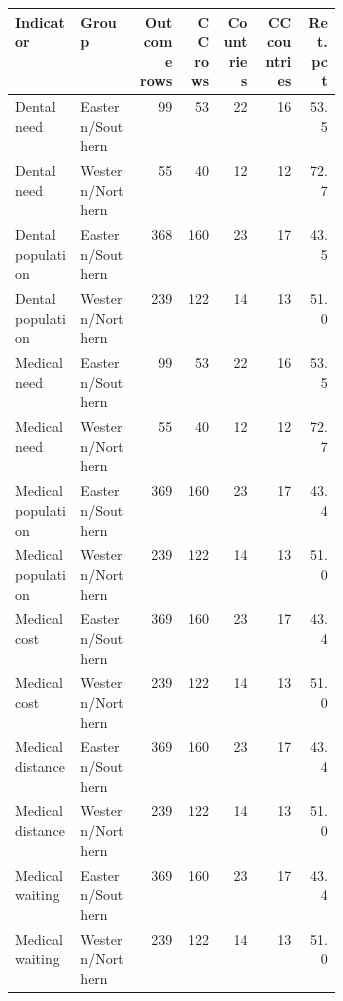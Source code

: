 \begin{tabular}{p{0.20\linewidth}p{0.18\linewidth}rrrrr}
\toprule
Indicator & Group & Outcome rows & CC rows & Countries & CC countries & Ret. pct \\
\midrule
Dental need & Eastern/Southern & 99 & 53 & 22 & 16 & 53.5 \\
Dental need & Western/Northern & 55 & 40 & 12 & 12 & 72.7 \\
Dental population & Eastern/Southern & 368 & 160 & 23 & 17 & 43.5 \\
Dental population & Western/Northern & 239 & 122 & 14 & 13 & 51.0 \\
Medical need & Eastern/Southern & 99 & 53 & 22 & 16 & 53.5 \\
Medical need & Western/Northern & 55 & 40 & 12 & 12 & 72.7 \\
Medical population & Eastern/Southern & 369 & 160 & 23 & 17 & 43.4 \\
Medical population & Western/Northern & 239 & 122 & 14 & 13 & 51.0 \\
Medical cost & Eastern/Southern & 369 & 160 & 23 & 17 & 43.4 \\
Medical cost & Western/Northern & 239 & 122 & 14 & 13 & 51.0 \\
Medical distance & Eastern/Southern & 369 & 160 & 23 & 17 & 43.4 \\
Medical distance & Western/Northern & 239 & 122 & 14 & 13 & 51.0 \\
Medical waiting & Eastern/Southern & 369 & 160 & 23 & 17 & 43.4 \\
Medical waiting & Western/Northern & 239 & 122 & 14 & 13 & 51.0 \\
\bottomrule
\end{tabular}
